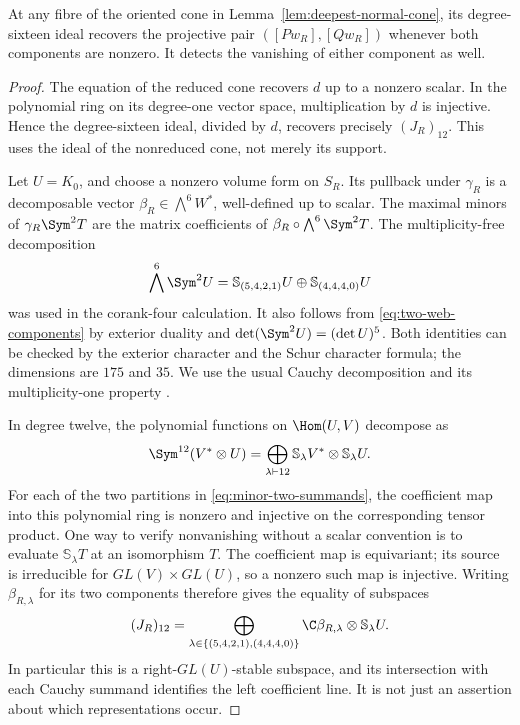 \begin{lemma}
\label{lem:plucker-component-readout}
At any fibre of the oriented cone in
Lemma~\ref{lem:deepest-normal-cone}, its degree-sixteen ideal
recovers the projective pair \(([Pw_R],[Qw_R])\) whenever both
components are nonzero.  It detects the vanishing of either component
as well.
\end{lemma}
\begin{proof}
The equation of the reduced cone recovers \(d\) up to a nonzero
scalar.  In the polynomial ring on its degree-one vector space,
multiplication by \(d\) is injective.  Hence the degree-sixteen
ideal, divided by \(d\), recovers precisely \((J_R)_{12}\).
This uses the ideal of the nonreduced cone, not merely its support.

Let \(U=K_0\), and choose a nonzero volume form on \(S_R\).
Its pullback under \(\gamma_R\) is a decomposable vector
\(\beta_R\in\bigwedge^6W^*\), well-defined up to scalar.
The maximal minors of \(\gamma_R\Sym^2T\) are the matrix
coefficients of \(\beta_R\circ\bigwedge^6\Sym^2T\).
The multiplicity-free decomposition
\begin{equation}\label{eq:minor-two-summands}
 \bigwedge^6\Sym^2U
 =\mathbb S_{(5,4,2,1)}U\oplus\mathbb S_{(4,4,4,0)}U
\end{equation}
was used in the corank-four calculation.  It also follows from
\eqref{eq:two-web-components} by exterior duality and
\(\det(\Sym^2U)=(\det U)^5\).  Both identities can be
checked by the exterior character and the Schur character formula;
the dimensions are \(175\) and \(35\).  We use the usual
Cauchy decomposition and its multiplicity-one property
\cite{FultonHarris,DCEP}.

In degree twelve, the polynomial functions on \(\Hom(U,V)\)
decompose as
\[
 \Sym^{12}(V^*\otimes U)
 =\bigoplus_{\lambda\vdash12}
          \mathbb S_\lambda V^*\otimes\mathbb S_\lambda U.
\]
For each of the two partitions in
\eqref{eq:minor-two-summands}, the coefficient map into this
polynomial ring is nonzero and injective on the corresponding tensor
product.  One way to verify nonvanishing without a scalar convention
is to evaluate \(\mathbb S_\lambda T\) at an isomorphism \(T\).
The coefficient map is equivariant; its source is irreducible for
\(GL(V)\times GL(U)\), so a nonzero such map is injective.
Writing \(\beta_{R,\lambda}\) for its two components therefore
gives the equality of subspaces
\begin{equation}\label{eq:minor-coefficient-readout}
 (J_R)_{12}=
 \bigoplus_{\lambda\in\{(5,4,2,1),(4,4,4,0)\}}
 \C\beta_{R,\lambda}\otimes\mathbb S_\lambda U.
\end{equation}
In particular this is a right-\(GL(U)\)-stable subspace, and its
intersection with each Cauchy summand identifies the left coefficient
line.  It is not just an assertion about which representations occur.


\end{proof}
